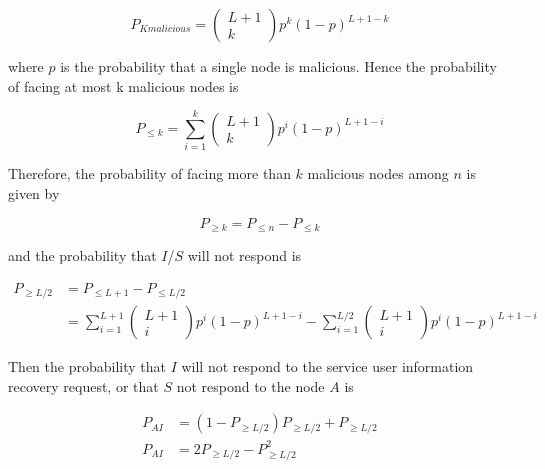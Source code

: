     \begin{equation}
      P_{K malicious} = \begin{pmatrix} L+1 \\ k\end{pmatrix} p^k (1-p)^{L+1-k}
    \end{equation}

    where $p$ is the probability that a single node is malicious. Hence the
probability of facing at most k malicious nodes is 

    \begin{equation}
      P_{\leq k} = \sum_{i=1}^{k} \begin{pmatrix} L+1 \\ k\end{pmatrix} p^i (1-p)^{L+1-i}
    \end{equation}

    Therefore, the probability of facing more than $k$ malicious nodes among
$n$ is given by

    \begin{equation}
      P_{\ge k} = P_{\leq n} - P_{\leq k}
    \end{equation}

    and the probability that $I$/$S$ will not respond is

    \begin{align}
      P_{\ge L/2} &= P_{\leq L+1} - P_{\leq L/2} \\
      &= \sum_{i=1}^{L+1} \begin{pmatrix} L+1 \\ i\end{pmatrix} p^i (1-p)^{L+1-i}
      - \sum_{i=1}^{L/2} \begin{pmatrix} L+1 \\ i\end{pmatrix} p^i (1-p)^{L+1-i}
    \end{align}


    Then the probability that $I$ will not respond to the service user
information recovery request, or that $S$ not respond to the node $A$ is

    \begin{align}
      P_{AI} &= (1- P_{\ge L/2}) P_{\ge L/2} +  P_{\ge L/2} \\
      P_{AI} &= 2P_{\ge L/2} - P^2_{\ge L/2}
    \end{align}


